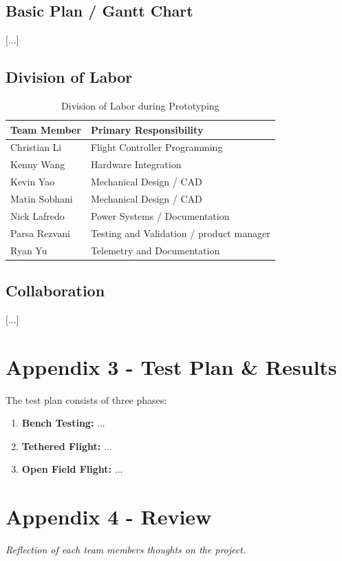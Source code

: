 \documentclass[journal, onecolumn]{IEEEtran}
\begin{document}
\subsection{Basic Plan / Gantt Chart}
[...]

\subsection{Division of Labor}
\begin{table}[H]
    \centering
    \begin{tabular}{|l|l|}
        \hline
        \textbf{Team Member} & \textbf{Primary Responsibility} \\ \hline
        Christian Li & Flight Controller Programming \\ \hline
        Kenny Wang & Hardware Integration \\ \hline
        Kevin Yao & Mechanical Design / CAD \\ \hline
        Matin Sobhani & Mechanical Design / CAD \\ \hline
        Nick Lafredo & Power Systems / Documentation \\ \hline
        Parsa Rezvani & Testing and Validation / product manager \\ \hline
        Ryan Yu & Telemetry and Documentation \\ \hline
    \end{tabular}
    \caption{Division of Labor during Prototyping}
\end{table}

\subsection{Collaboration}
[...]

\newpage
\section{Appendix 3 - Test Plan \& Results}
The test plan consists of three phases:
\begin{enumerate}
    \item \textbf{Bench Testing:} ...
    \item \textbf{Tethered Flight:} ...
    \item \textbf{Open Field Flight:} ...
\end{enumerate}

\newpage
\section{Appendix 4 - Review}
\textit{Reflection of each team members thoughts on the project.}
\end{document}
